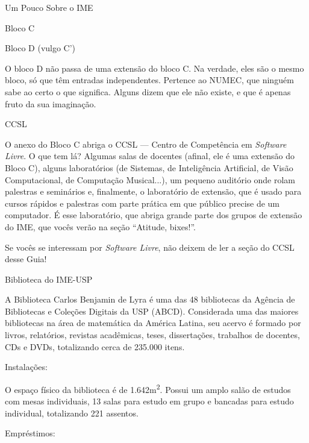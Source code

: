 \begin{secao}{Um Pouco Sobre o IME}
\begin{subsecao}{Bloco C}
\end{subsecao}

\begin{subsecao}{Bloco D (vulgo C')}

O bloco D não passa de uma extensão do bloco C. Na verdade, eles são o mesmo bloco,
só que têm entradas independentes. Pertence ao NUMEC, que ninguém sabe ao certo
o que significa. Alguns dizem que ele não existe, e que é apenas fruto da sua
imaginação.

\end{subsecao}

\begin{subsecao}{CCSL}

O anexo do Bloco C abriga o CCSL --- Centro de Competência em \textit{Software Livre}.
O que tem lá? Algumas salas de docentes (afinal, ele é uma extensão do
Bloco C), alguns laboratórios (de Sistemas, de Inteligência Artificial,
de Visão Computacional, de Computação Musical...), um pequeno auditório
onde rolam palestras e seminários e, finalmente, o laboratório de extensão,
que é usado para cursos rápidos e palestras com parte prática em que público
precise de um computador. É esse laboratório, que abriga grande parte dos grupos
de extensão do IME, que vocês verão na seção ``Atitude, bixes!''.

Se vocês se interessam por \textit{Software Livre}, não deixem de ler a seção
do CCSL desse Guia!

\end{subsecao}

\begin{subsecao}{Biblioteca do IME-USP}

A Biblioteca Carlos Benjamin de Lyra é uma das 48 bibliotecas da Agência de Bibliotecas e Coleções Digitais da USP (ABCD). Considerada uma das maiores bibliotecas na área de matemática da América Latina, seu acervo é formado por livros, relatórios, revistas acadêmicas, teses, dissertações, trabalhos de docentes, CDs e DVDs, totalizando cerca de 235.000 itens. 

\begin{subsubsecao}{Instalações:}

O espaço físico da biblioteca é de 1.642m\textsuperscript{2}. Possui um amplo salão de estudos com mesas individuais, 13 salas para estudo em grupo e bancadas para estudo individual, totalizando 221 assentos.
\end{subsubsecao}

\begin{subsubsecao}{Empréstimos:}


\end{subsubsecao}
\end{subsecao}
\end{secao}
